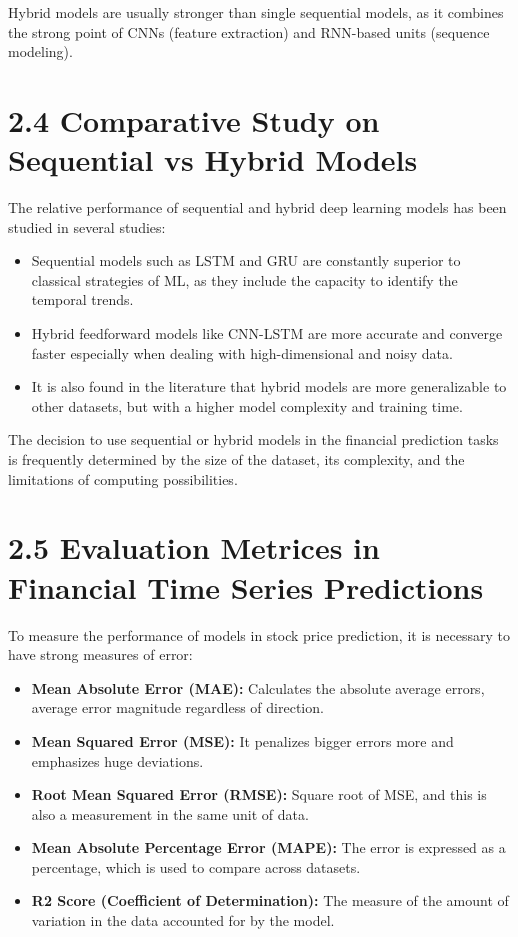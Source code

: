 \documentclass[12pt,a4paper]{report}
\begin{document}
Hybrid models are usually stronger than single sequential models, as it combines the strong point of CNNs (feature extraction) and RNN-based units (sequence modeling).

\section{2.4 Comparative Study on Sequential vs Hybrid Models}
The relative performance of sequential and hybrid deep learning models has been studied in several studies: 

\begin{itemize}
  \item Sequential models such as LSTM and GRU are constantly superior to classical strategies of ML, as they include the capacity to identify the temporal trends.
  \item Hybrid feedforward models like CNN-LSTM are more accurate and converge faster especially when dealing with high-dimensional and noisy data. 
  \item It is also found in the literature that hybrid models are more generalizable to other datasets, but with a higher model complexity and training time. 
\end{itemize}

The decision to use sequential or hybrid models in the financial prediction tasks is frequently determined by the size of the dataset, its complexity, and the limitations of computing possibilities.

\section{2.5 Evaluation Metrices in Financial Time Series Predictions}
To measure the performance of models in stock price prediction, it is necessary to have strong measures of error:

\begin{itemize}
  \item \textbf{Mean Absolute Error (MAE):} Calculates the absolute average errors, average error magnitude regardless of direction.
  \item \textbf{Mean Squared Error (MSE):} It penalizes bigger errors more and emphasizes huge deviations.
  \item \textbf{Root Mean Squared Error (RMSE):} Square root of MSE, and this is also a measurement in the same unit of data. 
  \item \textbf{Mean Absolute Percentage Error (MAPE):} The error is expressed as a percentage, which is used to compare across datasets.
  \item \textbf{R2 Score (Coefficient of Determination):} The measure of the amount of variation in the data accounted for by the model. 
\end{itemize}
\end{document}
